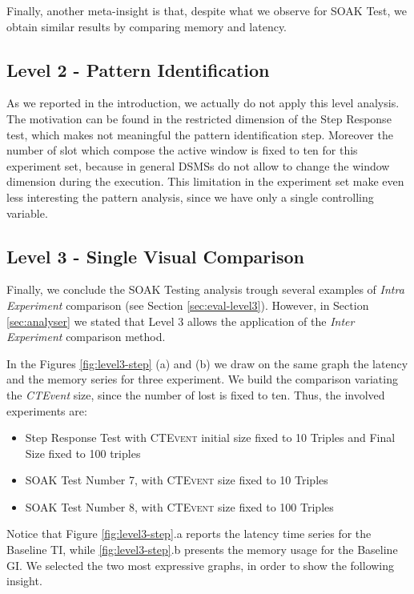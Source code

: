 Finally, another meta-insight is that, despite what we observe for SOAK Test, we obtain similar results by comparing memory and latency.

\subsection{Level 2 - Pattern Identification}\label{sec:level2-step-pattern}

As we reported in the introduction, we actually do not apply this level analysis. The motivation can be found in the restricted dimension of the Step Response test, which makes not meaningful the pattern identification step. Moreover the number of slot which compose the active window is fixed to ten for this experiment set, because in general DSMSs do not allow to change the window dimension during the execution. This limitation in the experiment set make even less interesting the pattern analysis, since we have only a single controlling variable.

\subsection{Level 3 - Single Visual Comparison}\label{sec:level3-step-inter}

Finally, we conclude the SOAK Testing analysis trough several examples of \textit{Intra Experiment} comparison (see Section \ref{sec:eval-level3}). However, in Section \ref{sec:analyser} we stated that Level 3 allows the application of the  \textit{Inter Experiment} comparison method.

In the Figures \ref{fig:level3-step} (a) and (b) we draw on the same graph the latency and the memory series for three experiment.  We build the comparison variating the \textit{CTEvent} size, since the number of lost is fixed to ten. Thus, the involved experiments are:
\begin{itemize}
\item Step Response Test with \textsc{CTEvent} initial size fixed to 10 Triples and Final Size fixed to 100 triples
\item SOAK Test Number 7, with \textsc{CTEvent} size fixed to 10 Triples
\item SOAK Test Number 8, with \textsc{CTEvent} size fixed to 100 Triples
\end{itemize}

Notice that Figure \ref{fig:level3-step}.a reports the latency time series for the Baseline TI, while \ref{fig:level3-step}.b presents the memory usage for the Baseline GI. We selected the two most expressive graphs, in order to show the following insight.

